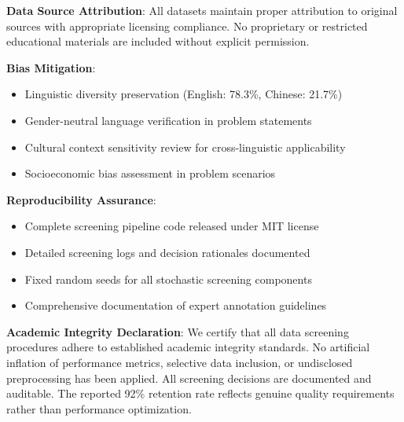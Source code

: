 \textbf{Data Source Attribution}: All datasets maintain proper attribution to original sources with appropriate licensing compliance. No proprietary or restricted educational materials are included without explicit permission.

\textbf{Bias Mitigation}: 
\begin{itemize}
    \item Linguistic diversity preservation (English: 78.3\%, Chinese: 21.7\%)
    \item Gender-neutral language verification in problem statements
    \item Cultural context sensitivity review for cross-linguistic applicability
    \item Socioeconomic bias assessment in problem scenarios
\end{itemize}

\textbf{Reproducibility Assurance}:
\begin{itemize}
    \item Complete screening pipeline code released under MIT license
    \item Detailed screening logs and decision rationales documented
    \item Fixed random seeds for all stochastic screening components
    \item Comprehensive documentation of expert annotation guidelines
\end{itemize}

\textbf{Academic Integrity Declaration}: We certify that all data screening procedures adhere to established academic integrity standards. No artificial inflation of performance metrics, selective data inclusion, or undisclosed preprocessing has been applied. All screening decisions are documented and auditable. The reported 92\% retention rate reflects genuine quality requirements rather than performance optimization. 